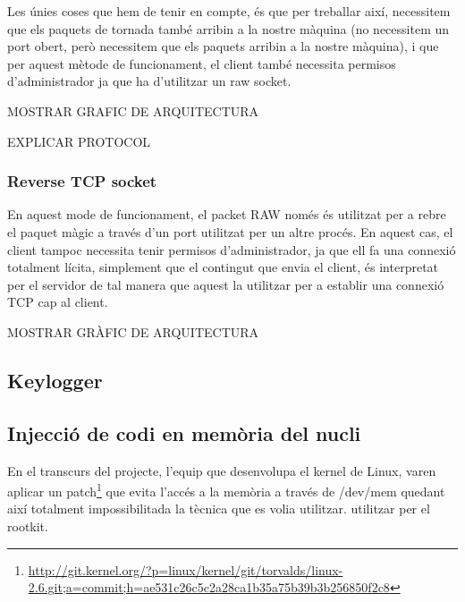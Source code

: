 Les únies coses que hem de tenir en compte, és que per treballar així, necessitem que els paquets de tornada també arribin a la nostre màquina 
(no necessitem un port obert, però necessitem que els paquets arribin a la nostre màquina), i que per aquest mètode de funcionament, el client 
també necessita permisos d'administrador ja que ha d'utilitzar un raw socket.

MOSTRAR GRAFIC DE ARQUITECTURA

EXPLICAR PROTOCOL


\subsubsection{Reverse TCP socket}
En aquest mode de funcionament, el packet RAW només és utilitzat per a rebre el paquet màgic a través d'un port utilitzat per un altre procés. En aquest 
cas, el client tampoc necessita tenir permisos d'administrador, ja que ell fa una connexió totalment lícita, simplement que el contingut que envia
el client, és interpretat per el servidor de tal manera que aquest la utilitzar per a establir una connexió TCP cap al client.

MOSTRAR GRÀFIC DE ARQUITECTURA
 
\subsection{Keylogger}
\subsection{Injecció de codi en memòria del nucli}
En el transcurs del projecte, l'equip que desenvolupa el kernel de Linux, varen aplicar un 
patch\footnote{\href{Patch que evita l'ús de /dev/mem per accedir a la memòria}{http://git.kernel.org/?p=linux/kernel/git/torvalds/linux-2.6.git;a=commit;h=ae531c26c5c2a28ca1b35a75b39b3b256850f2c8}} que evita
l'accés a la memòria a través de /dev/mem quedant així totalment impossibilitada la tècnica que es volia 
utilitzar.
utilitzar per el rootkit.

